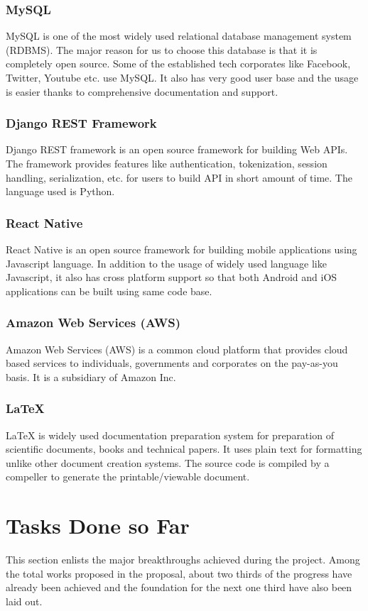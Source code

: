 \documentclass[12pt, a4paper, oneside]{article}
\begin{document}
\subsubsection{MySQL}
MySQL is one of the most widely used relational database management system (RDBMS). The major reason for us to choose this database is that it is completely open source. Some of the established tech corporates like Facebook, Twitter, Youtube etc. use MySQL. It also has very good user base and the usage is easier thanks to comprehensive documentation and support.

\subsubsection{Django REST Framework}
Django REST framework is an open source framework for building Web APIs. The framework provides features like authentication, tokenization, session handling, serialization, etc. for users to build API in short amount of time. The language used is Python.

\subsubsection{React Native}
React Native is an open source framework for building mobile applications using Javascript language. In addition to the usage of widely used language like Javascript, it also has cross platform support so that both Android and iOS applications can be built using same code base.

\subsubsection{Amazon Web Services (AWS)}
Amazon Web Services (AWS) is a common cloud platform that provides cloud based services to individuals, governments and corporates on the pay-as-you basis. It is a subsidiary of Amazon Inc.

\subsubsection{LaTeX}
LaTeX is widely used documentation preparation system for preparation of scientific documents, books and technical papers. It uses plain text for formatting unlike other document creation systems. The source code is compiled by a compeller to generate the printable/viewable document.

\pagebreak
\section{Tasks Done so Far}
This section enlists the major breakthroughs achieved during the project. Among the total works proposed in the proposal, about two thirds of the progress have already been achieved and the foundation for the next one third have also been laid out.
\end{document}
